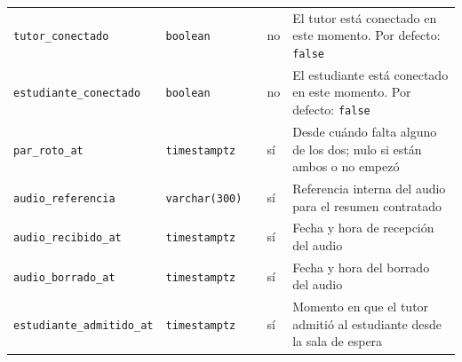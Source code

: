 {\begin{xltabular}{\textwidth}{@{}>{\raggedright\arraybackslash}p{3.6cm} >{\raggedright\arraybackslash}p{2.3cm} >{\raggedright\arraybackslash}p{1cm} >{\centering\arraybackslash}p{0.85cm} L@{}}
    \texttt{tutor\_\allowbreak{}conectado} & \texttt{boolean} &  & no & El tutor está conectado en este momento. Por defecto: \texttt{false} \\
    \texttt{estudiante\_\allowbreak{}conectado} & \texttt{boolean} &  & no & El estudiante está conectado en este momento. Por defecto: \texttt{false} \\
    \texttt{par\_\allowbreak{}roto\_\allowbreak{}at} & \texttt{timestamptz} &  & sí & Desde cuándo falta alguno de los dos; nulo si están ambos o no empezó \\
    \texttt{audio\_\allowbreak{}referencia} & \texttt{varchar(\allowbreak{}300)} &  & sí & Referencia interna del audio para el resumen contratado \\
    \texttt{audio\_\allowbreak{}recibido\_\allowbreak{}at} & \texttt{timestamptz} &  & sí & Fecha y hora de recepción del audio \\
    \texttt{audio\_\allowbreak{}borrado\_\allowbreak{}at} & \texttt{timestamptz} &  & sí & Fecha y hora del borrado del audio \\
    \texttt{estudiante\_\allowbreak{}admitido\_\allowbreak{}at} & \texttt{timestamptz} &  & sí & Momento en que el tutor admitió al estudiante desde la sala de espera \\
\end{xltabular}
}

